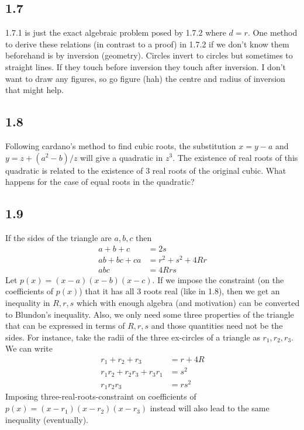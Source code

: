\documentclass{article}
\begin{document}
\subsection*{1.7}
1.7.1 is just the exact algebraic problem posed by 1.7.2 where $d=r$. One method to derive these relations (in contrast to a proof) in 1.7.2 if we don't know them beforehand is by inversion (geometry). Circles invert to circles but sometimes to straight lines. If they touch before inversion they touch after inversion. I don't want to draw any figures, so go figure (hah) the centre and radius of inversion that might help.

\subsection*{1.8}
Following cardano's method to find cubic roots, the substitution $x = y-a$ and $y = z + (a^2 - b)/z$ will give a quadratic in $z^3$. The existence of real roots of this quadratic is related to the existence of 3 real roots of the original cubic. What happens for the case of equal roots in the quadratic?

\subsection*{1.9}
If the sides of the triangle are $a,b,c$ then
\begin{align*}
    a+b+c &= 2s\\
    ab+bc+ca &= r^2 + s^2 + 4Rr \\
    abc &= 4Rrs
\end{align*}
Let $p(x) = (x-a)(x-b)(x-c)$. If we impose the constraint (on the coefficients of $p(x)$) that it has all 3 roots real (like in 1.8), then we get an inequality in $R,r,s$ which with enough algebra (and motivation) can be converted to Blundon's inequality. Also, we only need some three properties of the triangle that can be expressed in terms of $R,r,s$ and those quantities need not be the sides. For instance, take the radii of the three ex-circles of a triangle as $r_1,r_2,r_3$. We can write
\begin{align*}
    r_1 + r_2 + r_3 &= r+4R\\
    r_1r_2 + r_2r_3 + r_3r_1 &= s^2\\
    r_1r_2r_3 &= rs^2
\end{align*}
Imposing three-real-roots-constraint on coefficients of $p(x) = (x-r_1)(x-r_2)(x-r_3)$ instead will also lead to the same inequality (eventually).
\end{document}
